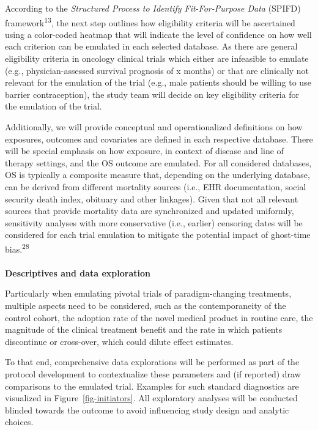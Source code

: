 \documentclass[
  letterpaper,
  DIV=11,
  numbers=noendperiod]{scrartcl}
\makeatletter
\let\oldparagraph\paragraph
\renewcommand{\paragraph}{
    \@ifstar
      \xxxParagraphStar
      \xxxParagraphNoStar
  }
\newcommand{\xxxParagraphStar}[1]{\oldparagraph*{#1}\mbox{}}
\newcommand{\xxxParagraphNoStar}[1]{\oldparagraph{#1}\mbox{}}
\makeatother
\begin{document}
According to the \emph{Structured Process to Identify Fit-For-Purpose
Data} (SPIFD) framework\textsuperscript{13}, the next step outlines how
eligibility criteria will be ascertained using a color-coded heatmap
that will indicate the level of confidence on how well each criterion
can be emulated in each selected database. As there are general
eligibility criteria in oncology clinical trials which either are
infeasible to emulate (e.g., physician-assessed survival prognosis of x
months) or that are clinically not relevant for the emulation of the
trial (e.g., male patients should be willing to use barrier
contraception), the study team will decide on key eligibility criteria
for the emulation of the trial.

Additionally, we will provide conceptual and operationalized definitions
on how exposures, outcomes and covariates are defined in each respective
database. There will be special emphasis on how exposure, in context of
disease and line of therapy settings, and the OS outcome are emulated.
For all considered databases, OS is typically a composite measure that,
depending on the underlying database, can be derived from different
mortality sources (i.e., EHR documentation, social security death index,
obituary and other linkages). Given that not all relevant sources that
provide mortality data are synchronized and updated uniformly,
sensitivity analyses with more conservative (i.e., earlier) censoring
dates will be considered for each trial emulation to mitigate the
potential impact of ghost-time bias.\textsuperscript{28}

\paragraph{\texorpdfstring{\textbf{Descriptives and data
exploration}}{Descriptives and data exploration}}\label{descriptives-and-data-exploration}

Particularly when emulating pivotal trials of paradigm-changing
treatments, multiple aspects need to be considered, such as the
contemporaneity of the control cohort, the adoption rate of the novel
medical product in routine care, the magnitude of the clinical treatment
benefit and the rate in which patients discontinue or cross-over, which
could dilute effect estimates.

To that end, comprehensive data explorations will be performed as part
of the protocol development to contextualize these parameters and (if
reported) draw comparisons to the emulated trial. Examples for such
standard diagnostics are visualized in Figure~\ref{fig-initiators}. All
exploratory analyses will be conducted blinded towards the outcome to
avoid influencing study design and analytic choices.
\end{document}
